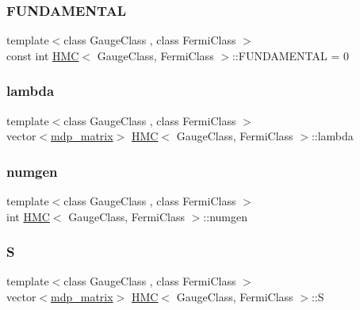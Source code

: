 \subsubsection{\texorpdfstring{F\+U\+N\+D\+A\+M\+E\+N\+T\+AL}{FUNDAMENTAL}}
{\footnotesize\ttfamily template$<$class Gauge\+Class , class Fermi\+Class $>$ \\
const int \hyperlink{class_h_m_c}{H\+MC}$<$ Gauge\+Class, Fermi\+Class $>$\+::F\+U\+N\+D\+A\+M\+E\+N\+T\+AL = 0\hspace{0.3cm}{\ttfamily [static]}}

\mbox{\label{class_h_m_c_a49121fbbef9d15281bc5a045fa0d07ce}} 
\subsubsection{\texorpdfstring{lambda}{lambda}}
{\footnotesize\ttfamily template$<$class Gauge\+Class , class Fermi\+Class $>$ \\
vector$<$\hyperlink{classmdp__matrix}{mdp\+\_\+matrix}$>$ \hyperlink{class_h_m_c}{H\+MC}$<$ Gauge\+Class, Fermi\+Class $>$\+::lambda}

\mbox{\label{class_h_m_c_a37d9344bc22f5964bc6e129c1987602a}} 
\subsubsection{\texorpdfstring{numgen}{numgen}}
{\footnotesize\ttfamily template$<$class Gauge\+Class , class Fermi\+Class $>$ \\
int \hyperlink{class_h_m_c}{H\+MC}$<$ Gauge\+Class, Fermi\+Class $>$\+::numgen}

\mbox{\label{class_h_m_c_a6007dbb2f937f629bbf5253a915b18fa}} 
\subsubsection{\texorpdfstring{S}{S}}
{\footnotesize\ttfamily template$<$class Gauge\+Class , class Fermi\+Class $>$ \\
vector$<$\hyperlink{classmdp__matrix}{mdp\+\_\+matrix}$>$ \hyperlink{class_h_m_c}{H\+MC}$<$ Gauge\+Class, Fermi\+Class $>$\+::S}

